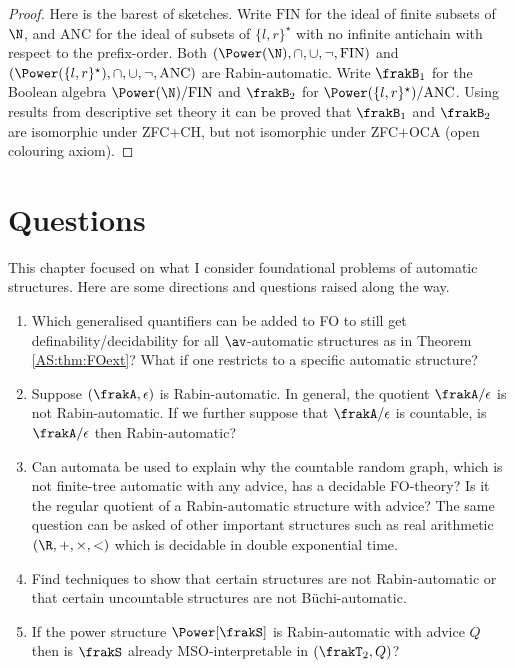 \begin{proof}
Here is the barest of sketches. 
Write $\mathrm{FIN}$ for the ideal of finite subsets of $\N$, and $\mathrm{ANC}$ for the ideal of subsets of $\{l,r\}^\star$ with no infinite antichain with respect to the prefix-order.
 Both $(\Power(\N),\cap,\cup,\neg,\mathrm{FIN})$ and $(\Power(\{l,r\}^\star),\cap,\cup,\neg,\mathrm{ANC})$ are Rabin-automatic. Write $\frakB_1$ for the Boolean algebra $\Power(\N)/\mathrm{FIN}$ and $\frakB_2$ for $\Power(\{l,r\}^\star)/\mathrm{ANC}$.
Using results from descriptive set theory it can be proved  that $\frakB_1$ and $\frakB_2$  are isomorphic under ZFC+CH, but  not isomorphic under ZFC+OCA (open colouring axiom).
\end{proof}


\section{Questions} \label{AS:sec:summary}

This chapter focused on what I consider foundational problems of automatic structures. 
Here are some directions and questions raised along the way.
\begin{enumerate}
\item Which generalised quantifiers can be added to FO to still get definability/decidability for all $\av$-automatic structures as in Theorem \ref{AS:thm:FOext}? 
What if one restricts to a specific automatic structure? 
\item Suppose $(\frakA,\epsilon)$ is Rabin-automatic. In general, the quotient $\frakA/\epsilon$ is not Rabin-automatic. If we further suppose that $\frakA/\epsilon$ is countable, is $\frakA/\epsilon$ then Rabin-automatic?
\item Can automata be used to explain why the countable random graph, which is not finite-tree automatic with any advice,  has a decidable FO-theory? Is it the regular quotient of a Rabin-automatic structure with advice? The same question can be asked of other important structures such as real arithmetic $(\R,+,\times,<)$ which is decidable in double exponential time. 
\item Find techniques to show that certain structures are not Rabin-automatic or that certain uncountable structures are not B\"uchi-automatic.
\item If the power structure $\Power[\frakS]$ is Rabin-automatic with advice $Q$ then is $\frakS$ already MSO-interpretable in $(\frakT_2,Q)$?
\end{enumerate}



